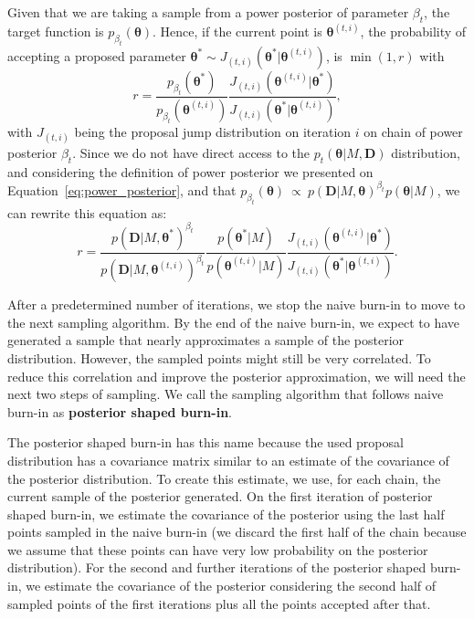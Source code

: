 Given that we are taking a sample from a power posterior of parameter
$\beta_t$, the target function is  $p_{\beta_t} ({\bm
\theta})$. Hence, if the current point is ${\bm \theta}^{(t, i)}$, the 
probability of accepting a proposed parameter 
${\bm \theta}^* \sim J_{(t, i)} ({\bm \theta}^* | {\bm \theta}^{(t,
i)})$, is $\min (1, r)$ with
\begin{equation}
    r = \frac{p_{\beta_t} ({\bm \theta}^*)}
             {p_{\beta_t} ({\bm \theta}^{(t, i)})}
        \frac{J_{(t, i)} ({\bm \theta}^{(t, i)} | {\bm \theta}^*)}
             {J_{(t, i)} ({\bm \theta}^* | {\bm \theta}^{(t, i)})},
\end{equation}
with $J_{(t, i)}$ being the proposal jump distribution on iteration $i$ 
on chain of power posterior $\beta_t$. Since we do not have direct
access to the $p_t({\bm \theta} | M, {\bm D})$ distribution, and
considering the definition of power posterior we presented on
Equation~\ref{eq:power_posterior}, and that $p_{\beta_t} ({\bm
\theta})~\propto~p ({\bm D}|M, {\bm \theta})^{\beta_t} p ({\bm \theta} |
M)$, we can rewrite this equation as:
\begin{equation}
    r = \frac{p ({\bm D} | M, {\bm \theta}^*)^{\beta_t}}
             {p ({\bm D} | M, {\bm \theta}^{(t, i)})^{\beta_t}}
        \frac{p ({\bm \theta}^* | M)}
             {p ({\bm \theta}^{(t, i)} | M)}
        \frac{J_{(t, i)} ({\bm \theta}^{(t, i)} | {\bm \theta}^*)}
             {J_{(t, i)} ({\bm \theta}^* | {\bm \theta}^{(t, i)})}.
    \label{eq:mh_ratio_step1}
\end{equation}

After a predetermined number of iterations, we stop the naive burn-in
to move to the next sampling algorithm. By the end of the naive burn-in,
we expect to have generated a sample that nearly approximates a sample
of the posterior distribution. However, the sampled points might still
be very correlated. To reduce this correlation and improve the posterior
approximation, we will need the next two steps of sampling. We call the 
sampling algorithm that follows naive burn-in as {\bf posterior shaped
burn-in}.

The posterior shaped burn-in has this name because the used proposal
distribution has a covariance matrix similar to an estimate of the 
covariance of the posterior distribution. To create this estimate, we 
use, for each chain, the current sample of the posterior generated. On 
the first iteration of posterior shaped burn-in, we estimate the 
covariance of the posterior using the last half points sampled in the 
naive burn-in (we discard the first half of the chain because we assume 
that these points can have very low probability on the posterior 
distribution). For the second and further iterations of the posterior
shaped burn-in, we estimate the covariance of the posterior considering
the second half of sampled points of the first iterations plus all the
points accepted after that.

